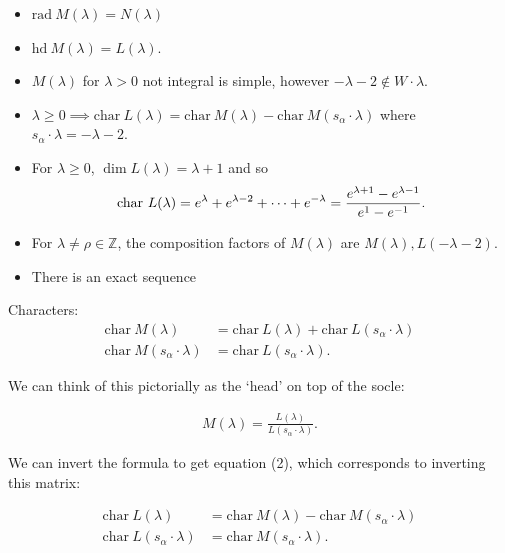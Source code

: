 \documentclass[11pt]{scrartcl}
\theoremstyle{definition}
\theoremstyle{theorem}
\theoremstyle{proof}
\theoremstyle{definition}
\theoremstyle{break}
\theoremstyle{problem}
\providecommand{\tightlist}{%
  \setlength{\itemsep}{0pt}\setlength{\parskip}{0pt}}
\newcommand{\ZZ}[0]{{\mathbb{Z}}}
\newcommand{\ch}[0]{\mathrm{char}~}
\begin{document}
\begin{itemize}
\tightlist
\item
  \(\mathrm{rad}~M(\lambda) = N(\lambda)\)
\item
  \(\mathrm{hd}~M(\lambda) = L(\lambda)\).
\item
  \(M(\lambda)\) for \(\lambda > 0\) not integral is simple, however
  \(-\lambda-2\not\in W\cdot \lambda\).
\item
  \(\lambda \geq 0 \implies \ch L(\lambda) = \ch M(\lambda) - \ch M(s_\alpha \cdot \lambda)\)
  where \(s_\alpha \cdot \lambda = -\lambda - 2\).
\item
  For \(\lambda \geq 0\), \(\dim L(\lambda) = \lambda + 1\) and so
  \begin{align*}\ch L(\lambda) = e^\lambda + e^{\lambda-2} + \cdots + e^{-\lambda} = {e^{\lambda + 1} - e^{\lambda - 1} \over e^1 - e^{-1}}.\end{align*}
\item
  For \(\lambda \neq \rho\in \ZZ\), the composition factors of
  \(M(\lambda)\) are \(M(\lambda), L(-\lambda - 2)\).
\item
  There is an exact sequence
\end{itemize}

\begin{center}
\end{center}

Characters: \begin{align*}
\ch M(\lambda) &= \ch L(\lambda) + \ch L(s_\alpha \cdot \lambda) \\
\ch M(s_\alpha \cdot \lambda) &= \ch L(s_\alpha \cdot \lambda)
.\end{align*}

We can think of this pictorially as the `head' on top of the socle:

\begin{align*}
M(\lambda) = \frac{L(\lambda)}{L(s_\alpha \cdot \lambda)}
.\end{align*}

We can invert the formula to get equation (2), which corresponds to
inverting this matrix:

\begin{align*}
\ch L(\lambda) &= \ch M(\lambda) - \ch M(s_\alpha \cdot \lambda) \\
\ch L(s_\alpha \cdot \lambda) &= \ch M(s_\alpha \cdot \lambda)
.\end{align*}
\end{document}
